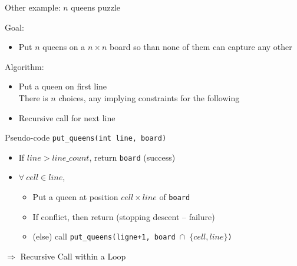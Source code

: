 \begin{frame}{Other example: $n$ queens puzzle}
  \begin{block}{Goal:}
    \begin{itemize}
    \item Put $n$ queens on a $n\times n$ board so than none of them can
      capture any other
    \end{itemize}    
  \end{block}

  \begin{block}{Algorithm:}
    \begin{itemize}
    \item Put a queen on first line\\
      There is $n$ choices, any implying constraints for the following
    \item Recursive call for next line
    \end{itemize}
  \end{block}

  \pause
  \begin{block}{Pseudo-code \texttt{put\_queens(int line, board)}}
    \begin{itemize}
    \item[] If $line > line\_count$, return \texttt{board} (success)
    \item[] $\forall\ cell \in line$,
      \begin{itemize}
      \item Put a queen at position $cell\times line$ of \texttt{board}
      \item If conflict, then return (stopping descent -- failure)
      \item (else) call \texttt{put\_queens(ligne+1, board $\cap$ $\{cell,line\}$)}
      \end{itemize}
    \end{itemize}

    \centerline{\alert{$\Rightarrow$ Recursive Call within a Loop}}
  \end{block}
\end{frame}
